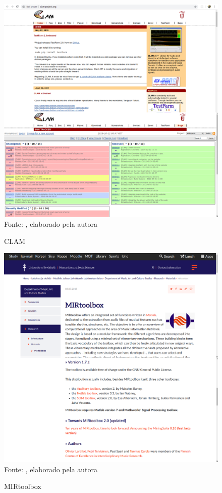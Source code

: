 \begin{figure}[!htb]
   \centering
   \caption{CLAM}\label{fig:clam} 
   \includegraphics[scale=0.30]{figuras/clam.png}
   \\Fonte: \cite{clam}, elaborado pela autora
\end{figure}

\begin{figure}[!htb]
   \centering
   \caption{MIRtoolbox}\label{fig:mirtoolbox} 
   \includegraphics[scale=0.35]{figuras/mirtoolbox.png}
   \\Fonte: \cite{mirtoolbox}, elaborado pela autora
\end{figure}